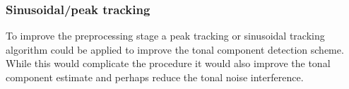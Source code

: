 \subsubsection{Sinusoidal/peak tracking}
To improve the preprocessing stage a peak tracking or sinusoidal tracking algorithm could be applied to improve the tonal component detection scheme. While this would complicate the procedure it would also improve the tonal component estimate and perhaps reduce the tonal noise interference\cite{McAulay1986}.



